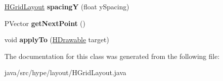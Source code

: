 \begin{DoxyCompactItemize}
\item 
\hypertarget{classhype_1_1layout_1_1_h_grid_layout_a99e58673120e870c4f5f596dfbc75c3b}{\hyperlink{classhype_1_1layout_1_1_h_grid_layout}{H\-Grid\-Layout} {\bfseries spacing\-Y} (float y\-Spacing)}\label{classhype_1_1layout_1_1_h_grid_layout_a99e58673120e870c4f5f596dfbc75c3b}

\item 
\hypertarget{classhype_1_1layout_1_1_h_grid_layout_a6a11960b000ae105846ec25740434851}{P\-Vector {\bfseries get\-Next\-Point} ()}\label{classhype_1_1layout_1_1_h_grid_layout_a6a11960b000ae105846ec25740434851}

\item 
\hypertarget{classhype_1_1layout_1_1_h_grid_layout_a91d7d95849d4c9a9396c87ba6433f99b}{void {\bfseries apply\-To} (\hyperlink{classhype_1_1drawable_1_1_h_drawable}{H\-Drawable} target)}\label{classhype_1_1layout_1_1_h_grid_layout_a91d7d95849d4c9a9396c87ba6433f99b}

\end{DoxyCompactItemize}


The documentation for this class was generated from the following file\-:\begin{DoxyCompactItemize}
\item 
java/src/hype/layout/H\-Grid\-Layout.\-java\end{DoxyCompactItemize}
